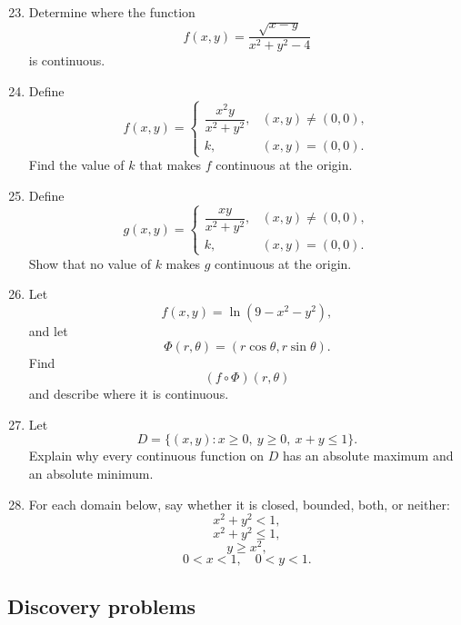 \begin{enumerate}
\setcounter{enumi}{22}

\item Determine where the function
\[
    f(x,y)=\frac{\sqrt{x-y}}{x^2+y^2-4}
\]
is continuous.

\item Define
\[
    f(x,y)=
    \begin{cases}
    \dfrac{x^2y}{x^2+y^2}, & (x,y)\ne(0,0),\\[2mm]
    k, & (x,y)=(0,0).
    \end{cases}
\]
Find the value of \(k\) that makes \(f\) continuous at the origin.

\item Define
\[
    g(x,y)=
    \begin{cases}
    \dfrac{xy}{x^2+y^2}, & (x,y)\ne(0,0),\\[2mm]
    k, & (x,y)=(0,0).
    \end{cases}
\]
Show that no value of \(k\) makes \(g\) continuous at the origin.

\item Let
\[
    f(x,y)=\ln(9-x^2-y^2),
\]
and let
\[
    \Phi(r,\theta)=(r\cos\theta,r\sin\theta).
\]
Find
\[
    (f\circ\Phi)(r,\theta)
\]
and describe where it is continuous.

\item Let
\[
    D=\{(x,y):x\ge0,\ y\ge0,\ x+y\le1\}.
\]
Explain why every continuous function on \(D\) has an absolute maximum and an
absolute minimum.

\item For each domain below, say whether it is closed, bounded, both, or neither:
\[
    x^2+y^2<1,
\]
\[
    x^2+y^2\le1,
\]
\[
    y\ge x^2,
\]
\[
    0<x<1,\quad 0<y<1.
\]
\end{enumerate}

\subsection*{Discovery problems}

